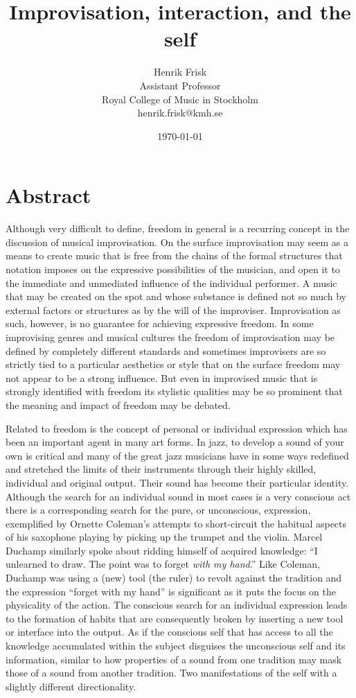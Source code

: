 \documentclass[a4paper]{article}
\title{Improvisation, interaction, and the self}
\author{Henrik Frisk\\{\small Assistant Professor}\\{\small Royal College of Music in Stockholm}\\{\small henrik.frisk@kmh.se}}
\date{\today}
\begin{document}
\maketitle

\thispagestyle{empty}

\section*{Abstract}


Although very difficult to define, freedom in general is a recurring concept in the discussion of musical improvisation. On the surface improvisation may seem as a means to create music that is free from the chains of the formal structures that notation imposes on the expressive possibilities of the musician, and open it to the immediate and unmediated influence of the individual performer. A music that may be created on the spot and whose substance is defined not so much by external factors or structures as by the will of the improviser. Improvisation as such, however, is no guarantee for achieving expressive freedom. In some improvising genres and musical cultures the freedom of improvisation may be defined by completely different standards and sometimes improvisers are so strictly tied to a particular aesthetics or style that on the surface freedom may not appear to be a strong influence. But even in improvised music that is strongly identified with freedom its stylistic qualities may be so prominent that the meaning and impact of freedom may be debated.

Related to freedom is the concept of personal or individual expression which has been an important agent in many art forms. In jazz, to develop a sound of your own is critical and many of the great jazz musicians have in some ways redefined and stretched the limits of their instruments through their highly skilled, individual and original output. Their sound has become their particular identity. Although the search for an individual sound in most cases is a very conscious act there is a corresponding search for the pure, or unconscious, expression, exemplified by Ornette Coleman's attempts to short-circuit the habitual aspects of his saxophone playing by picking up the trumpet and the violin. Marcel Duchamp similarly spoke about ridding himself of acquired knowledge: ``I unlearned to draw. The  point was to forget \emph{with my hand}.'' Like Coleman, Duchamp was using a (new) tool (the ruler) to revolt against the tradition and the expression ``forget with my hand'' is significant as it puts the focus on the physicality of the action. The conscious search for an individual expression leads to the formation of habits that are consequently broken by inserting a new tool or interface into the output. As if the conscious self that has access to all the knowledge accumulated within the subject disguises the unconscious self and its information, similar to how properties of a sound from one tradition may mask those of a sound from another tradition. Two manifestations of the self with a slightly different directionality.
\end{document}
